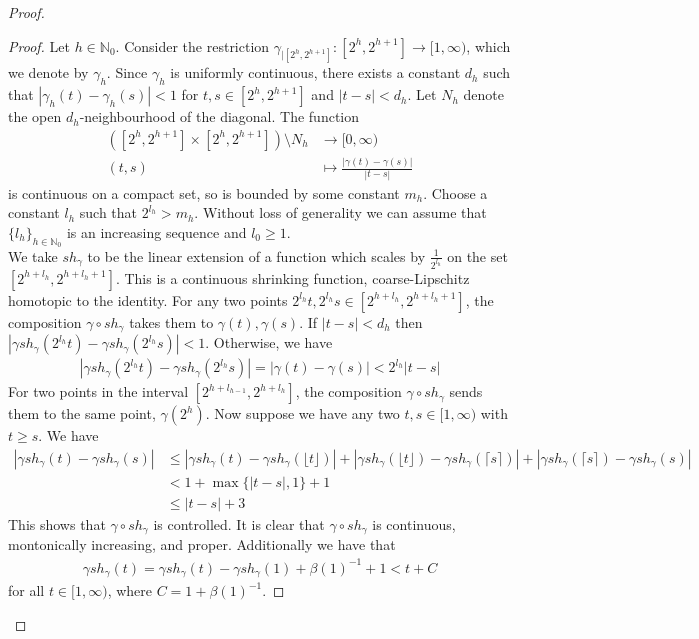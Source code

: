 \documentclass[a4paper,11pt]{article}
\theoremstyle{definition}
\theoremstyle{plain}
\theoremstyle{remark}
\begin{document}
{\begin{proof}
\begin{proof} Let $h\in \mathbb{N}_{0}$. Consider the restriction $\gamma_{|[2^{h},2^{h+1}]}: [2^h,2^{h+1}]\rightarrow [1,\infty)$, which we denote by $\gamma_{h}$. Since $\gamma_{h}$ is uniformly continuous, there exists a constant $d_{h}$ such that  $|\gamma_{h}(t)-\gamma_{h}(s)|<1$ for $t,s\in [2^h,2^{h+1}]$ and $|t-s|<d_{h}$. Let $N_{h}$ denote the open $d_{h}$-neighbourhood of the diagonal. The function 
\begin{align*}
([2^{h}, 2^{h+1}] \times [2^{h}, 2^{h+1}])\setminus N_{h} &\longrightarrow [0,\infty)\\
(t,s)&\longmapsto \frac{|\gamma(t)-\gamma(s)|}{|t-s|}
\end{align*}
is continuous on a compact set, so is bounded by some constant $m_{h}$. Choose a constant $l_h$ such that $2^{l_{h}}> m_{h}$. Without loss of generality we can assume that $\{l_{h}\}_{h\in \mathbb{N}_{0}}$ is an increasing sequence and $l_{0} \geq 1$. \\

We take $sh_{\gamma}$ to be the linear extension of a function which scales by $\frac{1}{2^{l_{h}}}$ on the set $[2^{h+l_{h}}, 2^{h+l_{h}+1}]$. This is a continuous shrinking function, coarse-Lipschitz homotopic to the identity. For any two points $2^{l_{h}}t, 2^{l_{h}} s \in [2^{h+l_{h}}, 2^{h+l_{h}+1}]$, the composition $\gamma\circ sh_{\gamma}$ takes them to $\gamma(t),\gamma(s)$. If $|t-s|<d_{h}$ then $|\gamma sh_{\gamma}(2^{l_{h}}t)-\gamma sh_{\gamma} (2^{l_{h}}s)|<1$. Otherwise, we have
\begin{align*}
|\gamma sh_{\gamma}(2^{l_{h}}t)-\gamma sh_{\gamma} (2^{l_{h}}s)| = |\gamma(t)-\gamma(s)| < 2^{l_{h}}|t-s|
\end{align*}
For two points in the interval $[2^{{h}+l_{h-1}}, 2^{h+l_{h}}]$, the composition $\gamma\circ sh_{\gamma}$ sends them to the same point, $\gamma(2^{h})$. Now suppose we have any two $t,s \in [1,\infty)$ with $t\geq s$. We have
\begin{align*}
|\gamma sh_{\gamma}(t)-\gamma sh_{\gamma}(s)|&\leq |\gamma sh_{\gamma}(t)-\gamma sh_{\gamma}(\lfloor{t}\rfloor)|+|\gamma sh_{\gamma}(\lfloor{t}\rfloor)-\gamma sh_{\gamma}(\lceil s\rceil)|+|\gamma sh_{\gamma}(\lceil s\rceil)-\gamma sh_{\gamma}(s)|\\
&< 1+\max\{|t-s|,1\}+1 \\
&\leq|t-s|+3
\end{align*}
This shows that $\gamma\circ sh_{\gamma}$ is controlled. It is clear that $\gamma\circ sh_{\gamma}$ is continuous, montonically increasing, and proper. Additionally we have that
\begin{align*}
\gamma sh_{\gamma}(t) = \gamma sh_{\gamma}(t) - \gamma sh_{\gamma}(1)+ \beta(1)^{-1} +1
 < t + C
  \end{align*} 
for all $t\in [1,\infty)$, where $C = 1 + \beta(1)^{-1}$. 


\end{proof}
\end{proof}}
\end{document}
